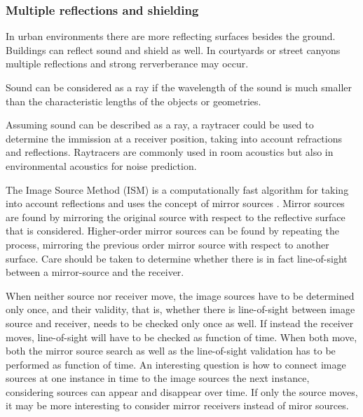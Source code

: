 




\subsubsection*{Multiple reflections and shielding} %
In urban environments there are more reflecting surfaces besides the ground.
Buildings can reflect sound and shield as well. In courtyards or street canyons
multiple reflections and strong rerverberance may occur.

Sound can be considered as a ray if the wavelength of the sound is much smaller
than the characteristic lengths of the objects or geometries. %

Assuming sound can be described as a ray, a raytracer could be used to determine
the immission at a receiver position, taking into account refractions and
reflections. Raytracers are commonly used in room acoustics but also in
environmental acoustics for noise prediction.

The Image Source Method (ISM) is a computationally fast algorithm for taking into
account reflections and uses the concept of mirror sources
\cite{Allen1979,Mechel2013}. Mirror sources are found by mirroring the original
source with respect to the reflective surface that is considered. Higher-order
mirror sources can be found by repeating the process, mirroring the previous
order mirror source with respect to another surface. Care should be taken to
determine whether there is in fact line-of-sight between a mirror-source and the
receiver.

When neither source nor receiver move, the image sources have to be determined
only once, and their validity, that is, whether there is line-of-sight between
image source and receiver, needs to be checked only once as well. If instead the
receiver moves, line-of-sight will have to be checked as function of time. When
both move, both the mirror source search as well as the line-of-sight validation
has to be performed as function of time. An interesting question is how to
connect image sources at one instance in time to the image sources the next
instance, considering sources can appear and disappear over time. If only the
source moves, it may be more interesting to consider mirror receivers instead of
miror sources.

